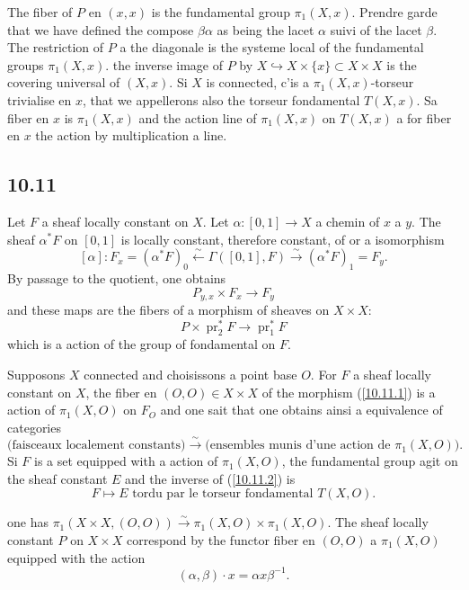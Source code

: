 \documentclass[12pt,a4paper]{article}
\theoremstyle{plain}
\theoremstyle{definition}
\theoremstyle{remark}
\DeclareMathOperator{\pr}{pr}
\begin{document}
The fiber of $P$ en $(x,x)$ is the fundamental group $\pi_1(X,x)$. Prendre garde that we have defined the compose $\beta\alpha$ as being the lacet $\alpha$ suivi of the lacet $\beta$. The restriction of $P$ a the diagonale is the systeme local of the fundamental groups $\pi_1(X,x)$. the inverse image of $P$ by $X \hookrightarrow X \times \{x\} \subset X \times X$ is the covering universal of $(X,x)$. Si $X$ is connected, c'is a $\pi_1(X,x)$-torseur trivialise en $x$, that we appellerons also the torseur fondamental $T(X,x)$. Sa fiber en $x$ is $\pi_1(X,x)$ and the action line of $\pi_1(X,x)$ on $T(X,x)$ a for fiber en $x$ the action by multiplication a line.

\subsection*{10.11}

Let $F$ a sheaf locally constant on $X$. Let $\alpha: [0,1] \to X$ a chemin of $x$ a $y$. The sheaf $\alpha^* F$ on $[0,1]$ is locally constant, therefore constant, of or a isomorphism
$$[\alpha]: F_x = (\alpha^* F)_0 \xleftarrow{\sim} \Gamma([0,1], F) \xrightarrow{\sim} (\alpha^* F)_1 = F_y.$$
By passage to the quotient, one obtains
$$P_{y,x} \times F_x \longrightarrow F_y$$
and these maps are the fibers of a morphism of sheaves on $X \times X$:
\begin{equation}\label{10.11.1}
P \times \pr_2^* F \longrightarrow \pr_1^* F \tag{10.11.1}
\end{equation}
which is a action of the group of fondamental on $F$.

Supposons $X$ connected and choisissons a point base $O$. For $F$ a sheaf locally constant on $X$, the fiber en $(O,O) \in X \times X$ of the morphism (\ref{10.11.1}) is a action of $\pi_1(X,O)$ on $F_O$ and one sait that one obtains ainsi a equivalence of categories
\begin{equation}\label{10.11.2}
\text{(faisceaux localement constants)} \xrightarrow{\sim} \text{(ensembles munis d'une action de } \pi_1(X,O)\text{)}. \tag{10.11.2}
\end{equation}
Si $F$ is a set equipped with a action of $\pi_1(X,O)$, the fundamental group agit on the sheaf constant $E$ and the inverse of (\ref{10.11.2}) is
$$F \longmapsto E \text{ tordu par le torseur fondamental } T(X,O).$$

one has $\pi_1(X \times X, (O,O)) \xrightarrow{\sim} \pi_1(X,O) \times \pi_1(X,O)$. The sheaf locally constant $P$ on $X \times X$ correspond by the functor fiber en $(O,O)$ a $\pi_1(X,O)$ equipped with the action
$$(\alpha, \beta)\cdot x = \alpha x \beta^{-1}.$$
\end{document}
